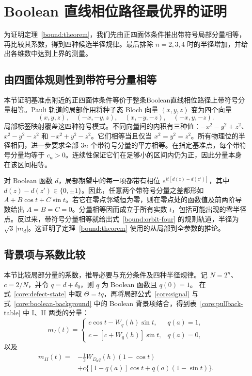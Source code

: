 \section{Boolean 直线相位路径最优界的证明}
\label{bound:appendix}

为证明定理~\ref{bound:theorem}，我们先由正四面体条件推出带符号局部分量相等，再比较其系数，得到四种候选半径规律。最后排除 $n=2,3,4$ 时的半径增加，并给出各维数中达到上界的测量。

\subsection{由四面体规则性到带符号分量相等}
\label{bound:app-regularity}
本节证明基准点附近的正四面体条件等价于整条Boolean直线相位路径上带符号分量相等。Pauli 轨道的局部作用将种子态 Bloch 向量 $(x,y,z)$ 变为四个向量
\begin{equation}
 (x,y,z),\quad(-x,-y,z),\quad(x,-y,-z),\quad(-x,y,-z).
 \label{bound:orbit-four}
\end{equation}
局部标签映射覆盖这四种符号模式。不同向量间的内积有三种值：$-x^2-y^2+z^2$、$x^2-y^2-z^2$ 和 $-x^2+y^2-z^2$。它们相等当且仅当 $x^2=y^2=z^2$。所有物理位的半径相同，进一步要求全部 $3n$ 个带符号分量的平方相等。在指定基准点，每个带符号分量均等于 $c_n>0$。连续性保证它们在足够小的区间内仍为正，因此分量本身在该区间相等。

对 Boolean 函数 $d$，局部期望中的每一项都带有相位 $e^{it[d(z)-d(z')]}$，其中 $d(z)-d(z')\in\{0,\pm1\}$。因此，任意两个带符号分量之差都形如 $A+B\cos t+C\sin t$。若它在零点邻域恒为零，则在零点处的函数值及前两阶导数给出 $A=B=C=0$。分量相等因而成立于所有实数 $t$，包括可能出现的零半径点。反过来，带符号分量相等就给出式~\eqref{bound:orbit-four} 的规则轨道，半径为 $\sqrt3\,|m_d|$。这证明了定理~\ref{bound:theorem} 使用的从局部到全参数的推论。

\subsection{背景项与系数比较}
\label{bound:app-coefficients}
本节比较局部分量的系数，推导必要与充分条件及四种半径规律。记 $N=2^n$、$c=2/N$，并令 $q=d+\delta_0$，则 $q$ 为 Boolean 函数且 $q(0)=1$。
在式~\eqref{core:defect-state} 中取 $\Theta=tq$，再将局部公式~\eqref{core:signal}
与式~\eqref{core:boolean-background} 中的 Boolean 背景项结合，得到表~\ref{core:pullback-table}
中 I、II 两类的分量：
\begin{equation}
 m_I(t)=\begin{cases}
 c\cos t-W_q(h)\sin t,&q(a)=1,\\
 c-[c+W_q(h)]\sin t,&q(a)=0,
 \end{cases}
 \label{bound:component-i}
\end{equation}
以及
\begin{equation}
 \begin{split}
 m_{II}(t)={}&-\tfrac12W_{D_aq}(h)(1-\cos t)\\
 &+c\bigl\{[1-q(a)]\cos t+q(a)(1-\sin t)\bigr\}.
 \end{split}
 \label{bound:component-ii}
\end{equation}

